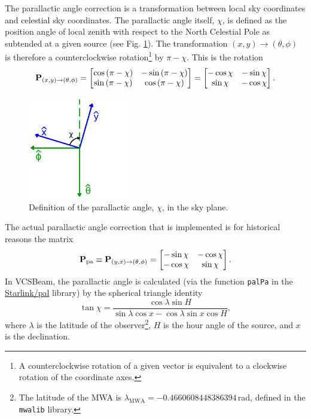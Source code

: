 \documentclass{book}
\newcommand{\vcsbeam}{{\sc VCSBeam}}
\newcommand{\transmat}[4]{\ensuremath{{\bf P}_{(#1,#2)\rightarrow(#3,#4)}}}
\newcommand{\pamat}{\ensuremath{{\bf P}_\text{pa}}}
\begin{document}
The parallactic angle correction is a transformation between local sky coordinates and celestial sky coordinates.
The parallactic angle itself, $\chi$, is defined as the position angle of local zenith with respect to the North Celestial Pole as subtended at a given source (see Fig. \ref{fig:skyangles}).
The transformation $(x,y)\rightarrow(\theta,\phi)$ is therefore a counterclockwise rotation\footnote{A counterclockwise rotation of a given vector is equivalent to a clockwise rotation of the coordinate axes.} by $\pi - \chi$.
This is the rotation
\begin{equation}
    \transmat{x}{y}{\theta}{\phi}
        = \begin{bmatrix}
            \cos\left(\pi - \chi\right) & -\sin\left(\pi - \chi\right) \\
            \sin\left(\pi - \chi\right) &  \cos\left(\pi - \chi\right)
        \end{bmatrix}
        = \begin{bmatrix}
            -\cos\chi & -\sin\chi \\
             \sin\chi & -\cos\chi
        \end{bmatrix}.
\end{equation}
\begin{figure}[!th]
    \centering
    \includegraphics[width=0.4\textwidth]{skyangles.png}
    \caption{Definition of the parallactic angle, $\chi$, in the sky plane.}
    \label{fig:skyangles}
\end{figure}
The actual parallactic angle correction that is implemented is for historical reasons the matrix
\begin{equation}
    \pamat \equiv
    \transmat{y}{x}{\theta}{\phi}
        = \begin{bmatrix}
            -\sin\chi & -\cos\chi \\
            -\cos\chi &  \sin\chi
        \end{bmatrix}.
\end{equation}
In \vcsbeam{}, the parallactic angle is calculated (via the function \texttt{palPa} in the \href{https://github.com/Starlink/pal}{Starlink/pal} library) by the spherical triangle identity
\begin{equation}
    \tan \chi = \frac{\cos \lambda \sin H}{\sin\lambda \cos x - \cos \lambda \sin x \cos H},
\end{equation}
where $\lambda$ is the latitude of the observer\footnote{The latitude of the MWA is $\lambda_\text{MWA} = -0.4660608448386394\,$rad, defined in the \texttt{mwalib} library.}, $H$ is the hour angle of the source, and $x$ is the declination.
\end{document}
